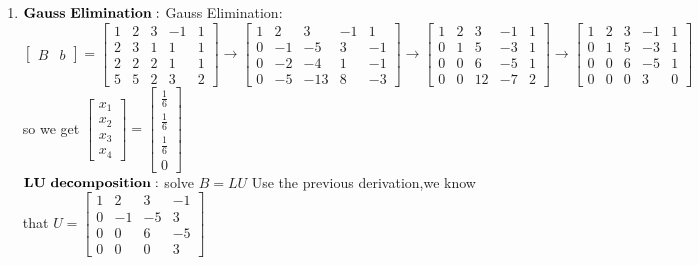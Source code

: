 \documentclass[english,onecolumn]{IEEEtran}
\begin{document}
\begin{enumerate}
    \item 
$\bold{  Gauss \  Elimination:}$ Gauss Elimination:$\left[\begin{array}{cc}B & b\end{array}\right]=\left[\begin{array}{cccc|c}1 & 2 & 3 & -1 & 1 \\ 2 & 3 & 1 & 1 & 1 \\ 2 & 2 & 2 & 1 & 1 \\ 5 & 5 & 2 & 3 & 2\end{array}\right] \rightarrow\left[\begin{array}{cccc|c}1 & 2 & 3 & -1 & 1 \\ 0 & -1 & -5 & 3 & -1 \\ 0 & -2 & -4 & 1 & -1 \\ 0 & -5 & -13 & 8 & -3\end{array}\right] \rightarrow\left[\begin{array}{cccc|c}1 & 2 & 3 & -1 & 1 \\ 0 & 1 & 5 & -3 & 1 \\ 0 & 0 & 6 & -5 & 1 \\ 0 & 0 & 12 & -7 & 2\end{array}\right] 
\rightarrow\left[\begin{array}{cccc|c}1 & 2 & 3 & -1 & 1 \\ 0 & 1 & 5 & -3 & 1 \\ 0 & 0 & 6 & -5 & 1 \\ 0 & 0 & 0 & 3 & 0\end{array}\right]  $
\\ so  we get $\left[\begin{array}{l}x_{1} \\ x_{2} \\ x_{3} \\ x_{4}\end{array}\right]=\left[\begin{array}{c}\frac{1}{6} \\ \frac{1}{6}  \\ \frac{1}{6}  \\ 0\end{array}\right]$
\\ $\bold{LU\  decomposition:}$ solve $B=LU$ Use the previous derivation,we know that $U=\left[\begin{array}{rrrr}1 & 2 & 3 & -1 \\ 0 & -1 & -5 & 3 \\ 0 & 0 & 6 & -5 \\ 0 & 0 & 0 & 3\end{array}\right]$

\end{enumerate}
\end{document}
